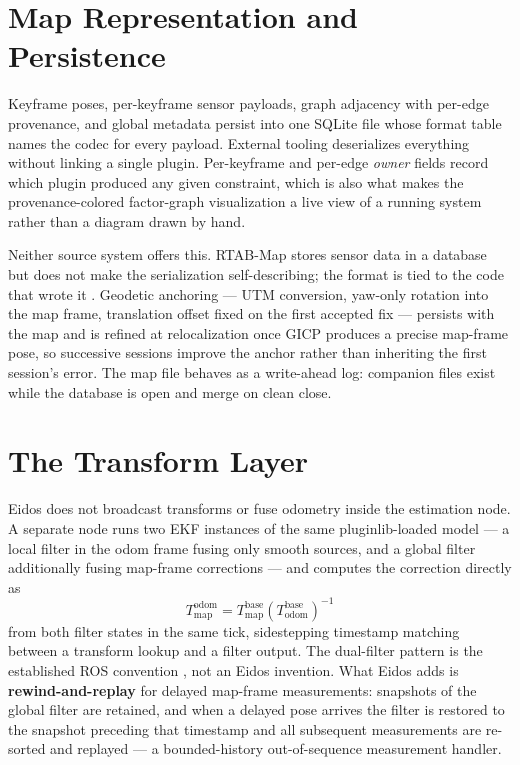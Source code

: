 \documentclass[conference]{IEEEtran}
\begin{document}
\section{Map Representation and Persistence}
\label{sec:map}
Keyframe poses, per-keyframe sensor payloads, graph adjacency with per-edge provenance, and global metadata persist into one SQLite file whose format table names the codec for every payload. External tooling deserializes everything without linking a single plugin. Per-keyframe and per-edge \emph{owner} fields record which plugin produced any given constraint, which is also what makes the provenance-colored factor-graph visualization a live view of a running system rather than a diagram drawn by hand.

Neither source system offers this. RTAB-Map stores sensor data in a database but does not make the serialization self-describing; the format is tied to the code that wrote it \parencite{labbe2019rtabmap}. Geodetic anchoring --- UTM conversion, yaw-only rotation into the map frame, translation offset fixed on the first accepted fix --- persists with the map and is refined at relocalization once GICP produces a precise map-frame pose, so successive sessions improve the anchor rather than inheriting the first session's error. The map file behaves as a write-ahead log: companion files exist while the database is open and merge on clean close.

\section{The Transform Layer}
\label{sec:transform}
Eidos does not broadcast transforms or fuse odometry inside the estimation node. A separate node runs two EKF instances of the same pluginlib-loaded model --- a local filter in the odom frame fusing only smooth sources, and a global filter additionally fusing map-frame corrections --- and computes the correction directly as
\begin{equation}
T_{\text{map}}^{\text{odom}} = T_{\text{map}}^{\text{base}}\left(T_{\text{odom}}^{\text{base}}\right)^{-1}
\end{equation}
from both filter states in the same tick, sidestepping timestamp matching between a transform lookup and a filter output. The dual-filter pattern is the established ROS convention \parencite{moore2014generalized,labbe2019rtabmap}, not an Eidos invention. What Eidos adds is \textbf{rewind-and-replay} for delayed map-frame measurements: snapshots of the global filter are retained, and when a delayed pose arrives the filter is restored to the snapshot preceding that timestamp and all subsequent measurements are re-sorted and replayed --- a bounded-history out-of-sequence measurement handler.
\end{document}
